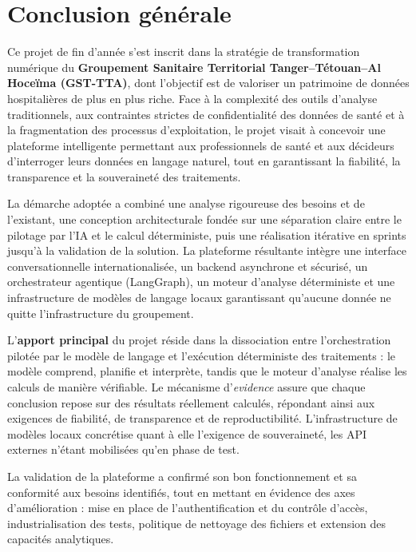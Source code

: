 \chapter*{Conclusion générale}

Ce projet de fin d'année s'est inscrit dans la stratégie de transformation numérique du
\textbf{Groupement Sanitaire Territorial Tanger--Tétouan--Al Hoceïma (GST-TTA)}, dont l'objectif
est de valoriser un patrimoine de données hospitalières de plus en plus riche. Face à la
complexité des outils d'analyse traditionnels, aux contraintes strictes de confidentialité
des données de santé et à la fragmentation des processus d'exploitation, le projet visait à
concevoir une plateforme intelligente permettant aux professionnels de santé et aux décideurs
d'interroger leurs données en langage naturel, tout en garantissant la fiabilité, la
transparence et la souveraineté des traitements.

La démarche adoptée a combiné une analyse rigoureuse des besoins et de l'existant, une
conception architecturale fondée sur une séparation claire entre le pilotage par l'IA et le
calcul déterministe, puis une réalisation itérative en sprints jusqu'à la validation de la
solution. La plateforme résultante intègre une interface conversationnelle internationalisée,
un backend asynchrone et sécurisé, un orchestrateur agentique (LangGraph), un moteur d'analyse
déterministe et une infrastructure de modèles de langage locaux garantissant qu'aucune donnée
ne quitte l'infrastructure du groupement.

L'\textbf{apport principal} du projet réside dans la dissociation entre l'orchestration pilotée
par le modèle de langage et l'exécution déterministe des traitements : le modèle comprend,
planifie et interprète, tandis que le moteur d'analyse réalise les calculs de manière
vérifiable. Le mécanisme d'\textit{evidence} assure que chaque conclusion repose sur des
résultats réellement calculés, répondant ainsi aux exigences de fiabilité, de transparence
et de reproductibilité. L'infrastructure de modèles locaux concrétise quant à elle
l'exigence de souveraineté, les API externes n'étant mobilisées qu'en phase de test.

La validation de la plateforme a confirmé son bon fonctionnement et sa conformité aux besoins
identifiés, tout en mettant en évidence des axes d'amélioration : mise en place de
l'authentification et du contrôle d'accès, industrialisation des tests, politique de nettoyage
des fichiers et extension des capacités analytiques.


